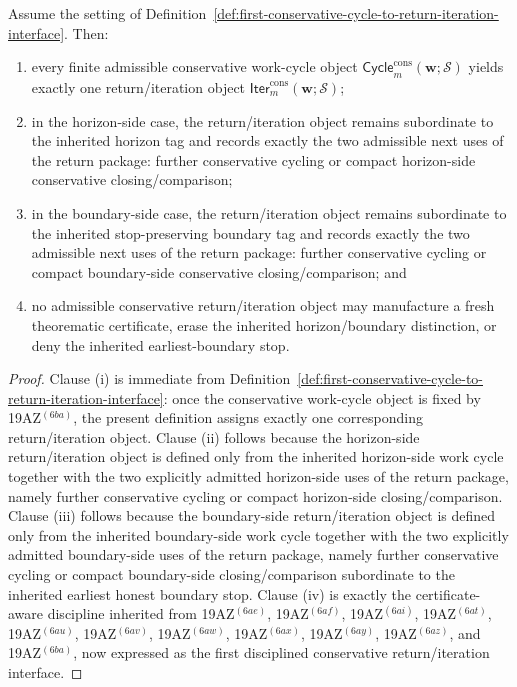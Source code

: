 \begin{proposition}
\label{prop:every-finite-admissible-conservative-work-cycle-yields-exactly-one-conservative-return-iteration-object}
Assume the setting of Definition~\ref{def:first-conservative-cycle-to-return-iteration-interface}. Then:
\begin{enumerate}[label=(\roman*)]
  \item every finite admissible conservative work-cycle object \(\mathsf{Cycle}^{\mathrm{cons}}_{m}(\mathbf w;\mathcal S)\) yields exactly one return/iteration object \(\mathsf{Iter}^{\mathrm{cons}}_{m}(\mathbf w;\mathcal S)\);
  \item in the horizon-side case, the return/iteration object remains subordinate to the inherited horizon tag and records exactly the two admissible next uses of the return package: further conservative cycling or compact horizon-side conservative closing/comparison;
  \item in the boundary-side case, the return/iteration object remains subordinate to the inherited stop-preserving boundary tag and records exactly the two admissible next uses of the return package: further conservative cycling or compact boundary-side conservative closing/comparison; and
  \item no admissible conservative return/iteration object may manufacture a fresh theorematic certificate, erase the inherited horizon/boundary distinction, or deny the inherited earliest-boundary stop.
\end{enumerate}
\end{proposition}

\begin{proof}
Clause (i) is immediate from Definition~\ref{def:first-conservative-cycle-to-return-iteration-interface}: once the conservative work-cycle object is fixed by 19AZ$^{(6ba)}$, the present definition assigns exactly one corresponding return/iteration object. Clause (ii) follows because the horizon-side return/iteration object is defined only from the inherited horizon-side work cycle together with the two explicitly admitted horizon-side uses of the return package, namely further conservative cycling or compact horizon-side closing/comparison. Clause (iii) follows because the boundary-side return/iteration object is defined only from the inherited boundary-side work cycle together with the two explicitly admitted boundary-side uses of the return package, namely further conservative cycling or compact boundary-side closing/comparison subordinate to the inherited earliest honest boundary stop. Clause (iv) is exactly the certificate-aware discipline inherited from 19AZ$^{(6ae)}$, 19AZ$^{(6af)}$, 19AZ$^{(6ai)}$, 19AZ$^{(6at)}$, 19AZ$^{(6au)}$, 19AZ$^{(6av)}$, 19AZ$^{(6aw)}$, 19AZ$^{(6ax)}$, 19AZ$^{(6ay)}$, 19AZ$^{(6az)}$, and 19AZ$^{(6ba)}$, now expressed as the first disciplined conservative return/iteration interface.
\end{proof}

